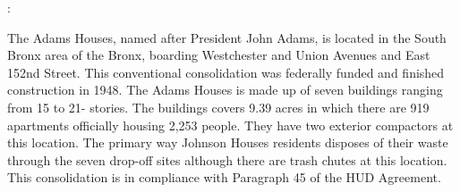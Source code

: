 :

The Adams Houses, named after President John Adams,  is located in the South Bronx area of the Bronx, boarding Westchester and Union Avenues and East 152nd Street. This conventional consolidation was federally funded and finished construction in 1948. The Adams Houses is made up of seven buildings ranging from 15 to 21- stories.  The buildings covers 9.39 acres in which there are 919 apartments officially housing 2,253 people. They have two exterior compactors at this location. The primary way Johnson Houses residents disposes of their waste through the seven drop-off sites although there are trash chutes at this location. This consolidation is in compliance with Paragraph 45 of the HUD Agreement. 
